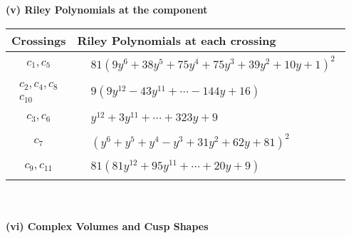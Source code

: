 \documentclass[1p]{elsarticle_modified}
\theoremstyle{definition}
\begin{document}
\flushleft \textbf{(v) Riley Polynomials at the component}\newline \\
\begin{tabular}{m{50pt}|m{274pt}}
Crossings & \hspace{64pt}Riley Polynomials at each crossing \\
\hline $$\begin{aligned}c_{1},c_{5}\end{aligned}$$&$\begin{aligned}
&81(9 y^6+38 y^5+75 y^4+75 y^3+39 y^2+10 y+1)^2
\end{aligned}$\\
\hline $$\begin{aligned}c_{2},c_{4},c_{8}\\c_{10}\end{aligned}$$&$\begin{aligned}
&9(9 y^{12}-43 y^{11}+\cdots-144 y+16)
\end{aligned}$\\
\hline $$\begin{aligned}c_{3},c_{6}\end{aligned}$$&$\begin{aligned}
&y^{12}+3 y^{11}+\cdots+323 y+9
\end{aligned}$\\
\hline $$\begin{aligned}c_{7}\end{aligned}$$&$\begin{aligned}
&(y^6+y^5+y^4- y^3+31 y^2+62 y+81)^2
\end{aligned}$\\
\hline $$\begin{aligned}c_{9},c_{11}\end{aligned}$$&$\begin{aligned}
&81(81 y^{12}+95 y^{11}+\cdots+20 y+9)
\end{aligned}$\\
\hline
\end{tabular}\\~\\
\newpage\flushleft \textbf{(vi) Complex Volumes and Cusp Shapes}
\end{document}
